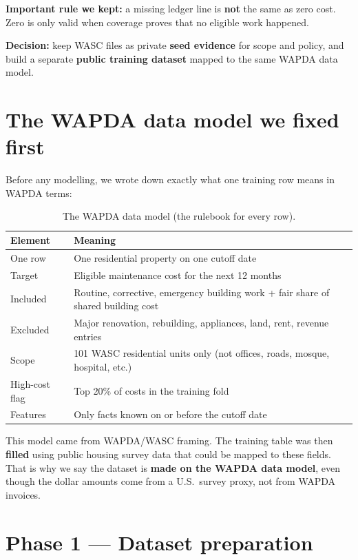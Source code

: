 \documentclass[11pt,a4paper]{article}
\begin{document}
\textbf{Important rule we kept:} a missing ledger line is \textbf{not} the same as zero cost. Zero is only valid when coverage proves that no eligible work happened.

\textbf{Decision:} keep WASC files as private \textbf{seed evidence} for scope and policy, and build a separate \textbf{public training dataset} mapped to the same WAPDA data model.

\section{The WAPDA data model we fixed first}

Before any modelling, we wrote down exactly what one training row means in WAPDA terms:

\begin{table}[ht]
\centering
\caption{The WAPDA data model (the rulebook for every row).}
\begin{tabular}{@{}lp{10cm}@{}}
\toprule
Element & Meaning \\
\midrule
One row & One residential property on one cutoff date \\
Target & Eligible maintenance cost for the next 12 months \\
Included & Routine, corrective, emergency building work + fair share of shared building cost \\
Excluded & Major renovation, rebuilding, appliances, land, rent, revenue entries \\
Scope & 101 WASC residential units only (not offices, roads, mosque, hospital, etc.) \\
High-cost flag & Top 20\% of costs in the training fold \\
Features & Only facts known on or before the cutoff date \\
\bottomrule
\end{tabular}
\end{table}

This model came from WAPDA/WASC framing. The training table was then \textbf{filled} using public housing survey data that could be mapped to these fields. That is why we say the dataset is \textbf{made on the WAPDA data model}, even though the dollar amounts come from a U.S.\ survey proxy, not from WAPDA invoices.

\section{Phase 1 --- Dataset preparation}
\end{document}
